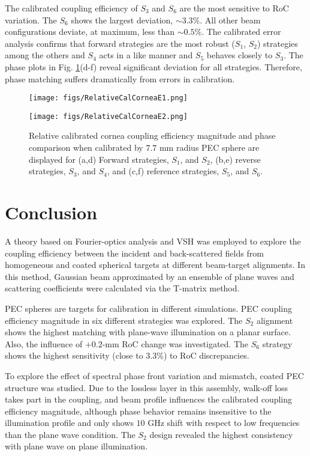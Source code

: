 \documentclass{osa-article}
\begin{document}
 The calibrated coupling efficiency of $S_3$ and $S_6$ are the most sensitive to RoC variation. The $S_6$ shows the largest deviation, $\sim 3.3 \%$. All other beam configurations deviate, at maximum, less than $\sim 0.5 \%$. The calibrated error analysis confirms that forward strategies are the most robust ($S_1$, $S_2$) strategies among the others and $S_4$ acts in a like manner and $S_5$ behaves closely to $S_3$. The phase plots in Fig. \ref{error}(d-f) reveal significant deviation for all strategies. Therefore, phase matching suffers dramatically from errors in calibration. 

 
\begin{figure}[ht]
\centering
\texttt{[image: figs/RelativeCalCorneaE1.png]}
\vspace*{-6 mm}

\texttt{[image: figs/RelativeCalCorneaE2.png]}
\caption{ Relative calibrated cornea coupling efficiency magnitude and phase comparison when calibrated by $7.7$ mm radius PEC sphere are displayed for (a,d) Forward strategies, $S_1$, and $S_2$, (b,e) reverse strategies, $S_3$, and $S_4$, and (c,f) reference strategies, $S_5$, and $S_6$.}\label{error}
\end{figure}


\section{Conclusion} 
A theory based on Fourier-optics analysis and VSH was employed to explore the coupling efficiency between the incident and back-scattered fields from homogeneous and coated spherical targets at different beam-target alignments. In this method, Gaussian beam approximated by an ensemble of plane waves and scattering coefficients were calculated via the T-matrix method. 

PEC spheres are targets for calibration in different simulations. PEC coupling efficiency magnitude in six different strategies was explored. The $S_2$ alignment shows the highest matching with plane-wave illumination on a planar surface. Also, the influence of $+0.2$-mm RoC change was investigated. The $S_6$ strategy shows the highest sensitivity (close to $3.3\%$) to RoC discrepancies. 

To explore the effect of spectral phase front variation and mismatch, coated PEC structure was studied. Due to the lossless layer in this assembly, walk-off loss takes part in the coupling, and beam profile influences the calibrated coupling efficiency magnitude, although phase behavior remains insensitive to the illumination profile and only shows $10$ GHz shift with respect to low frequencies than the plane wave condition. The $S_2$ design revealed the highest consistency with plane wave on plane illumination.
\end{document}
